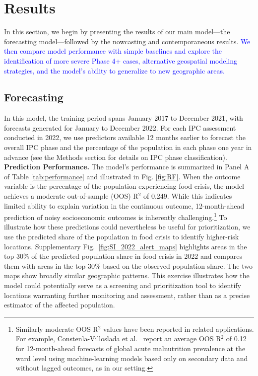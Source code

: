 \documentclass[pdflatex,sn-mathphys-num]{sn-jnl}%
\theoremstyle{thmstyleone}%
\theoremstyle{thmstyletwo}%
\theoremstyle{thmstylethree}%
\begin{document}
\section*{Results}

In this section, we begin by presenting the results of our main model—the forecasting model—followed by the nowcasting and contemporaneous results. \textcolor{blue}{We then compare model performance with simple baselines and explore the identification of more severe Phase 4+ cases, alternative geospatial modeling strategies, and the model’s ability to generalize to new geographic areas.}


\subsection*{Forecasting}

In this model, the training period spans January 2017 to December 2021, with forecasts generated for January to December 2022. For each IPC assessment conducted in 2022, we use predictors available 12 months earlier to forecast the overall IPC phase and the percentage of the population in each phase one year in advance (see the Methods section for details on IPC phase classification).\\

\noindent\textbf{Prediction Performance.}
The model's performance is summarized in Panel A of Table \ref{tab:performance} and illustrated in Fig. \ref{fig:RF}. When the outcome variable is the percentage of the population experiencing food crisis, the model achieves a moderate out-of-sample (OOS) R$^2$ of 0.249. While this indicates limited ability to explain variation in the continuous outcome, 12-month-ahead prediction of noisy socioeconomic outcomes is inherently challenging.\footnote{Similarly moderate OOS R$^2$ values have been reported in related applications. For example, Constenla-Villoslada et al.~\cite{ConstenlaVilloslada2025Malnutrition} report an average OOS R$^2$ of 0.12 for 12-month-ahead forecasts of global acute malnutrition prevalence at the ward level using machine-learning models based only on secondary data and without lagged outcomes, as in our setting.} To illustrate how these predictions could nevertheless be useful for prioritization, we use the predicted share of the population in food crisis to identify higher-risk locations. Supplementary Fig.~\ref{fig:SI_2022_alert_maps} highlights areas in the top 30\% of the predicted population share in food crisis in 2022 and compares them with areas in the top 30\% based on the observed population share. The two maps show broadly similar geographic patterns. This exercise illustrates how the model could potentially serve as a screening and prioritization tool to identify locations warranting further monitoring and assessment, rather than as a precise estimator of the affected population.
\end{document}
